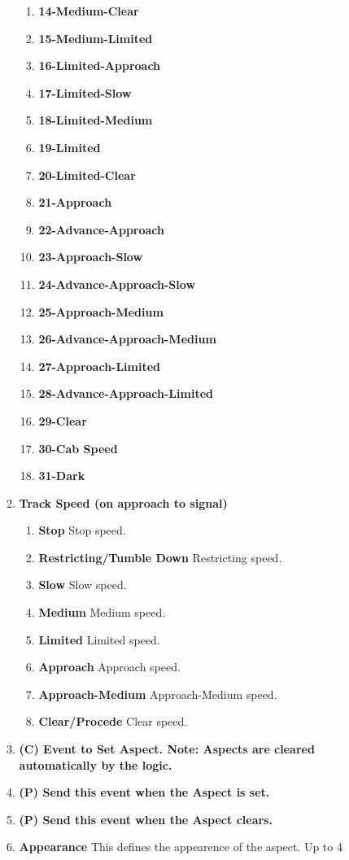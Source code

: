 \begin{enumerate}
\begin{enumerate}
\begin{enumerate}
\item \textbf{14-Medium-Clear}
\item \textbf{15-Medium-Limited}
\item \textbf{16-Limited-Approach}
\item \textbf{17-Limited-Slow}
\item \textbf{18-Limited-Medium}
\item \textbf{19-Limited}
\item \textbf{20-Limited-Clear}
\item \textbf{21-Approach}
\item \textbf{22-Advance-Approach}
\item \textbf{23-Approach-Slow}
\item \textbf{24-Advance-Approach-Slow}
\item \textbf{25-Approach-Medium}
\item \textbf{26-Advance-Approach-Medium}
\item \textbf{27-Approach-Limited}
\item \textbf{28-Advance-Approach-Limited}
\item \textbf{29-Clear}
\item \textbf{30-Cab Speed}
\item \textbf{31-Dark}
\end{enumerate}
\item \textbf{Track Speed (on approach to signal)}
\begin{enumerate}
\item \textbf{Stop} Stop speed.
\item \textbf{Restricting/Tumble Down} Restricting speed.
\item \textbf{Slow} Slow speed.
\item \textbf{Medium} Medium speed.
\item \textbf{Limited} Limited speed.
\item \textbf{Approach} Approach speed.
\item \textbf{Approach-Medium} Approach-Medium speed.
\item \textbf{Clear/Procede} Clear speed.
\end{enumerate}
\item \textbf{(C) Event to Set Aspect. Note: Aspects are cleared automatically 
by the logic.}
\item \textbf{(P) Send this event when the Aspect is set.}
\item \textbf{(P) Send this event when the Aspect clears.}
\item \textbf{Appearance} This defines the appearence of the aspect.  Up to 4 

\end{enumerate}
\end{enumerate}
